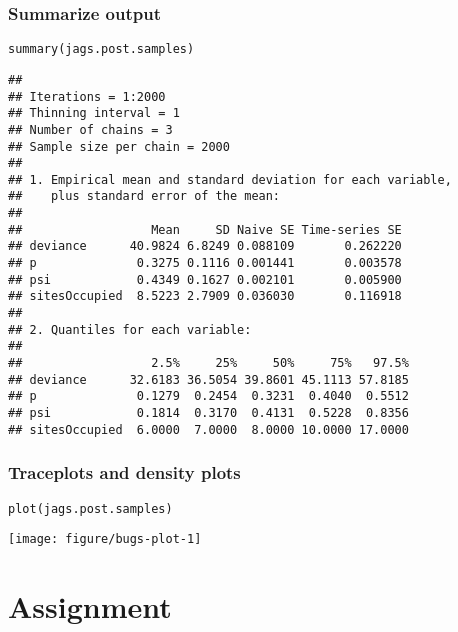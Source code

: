\documentclass[color=usenames,dvipsnames]{beamer}\usepackage[]{graphicx}\usepackage[]{color}
\makeatletter
\newcommand{\hlstd}[1]{\textcolor[rgb]{0,0,0}{#1}}%
\newcommand{\hlkwd}[1]{\textcolor[rgb]{0.004,0.004,0.506}{#1}}%
\newenvironment{kframe}{%
 \def\at@end@of@kframe{}%
 \ifinner\ifhmode%
  \def\at@end@of@kframe{\end{minipage}}%
  \begin{minipage}{\columnwidth}%
 \fi\fi%
 \def\FrameCommand##1{\hskip\@totalleftmargin \hskip-\fboxsep
 \colorbox{shadecolor}{##1}\hskip-\fboxsep
     \hskip-\linewidth \hskip-\@totalleftmargin \hskip\columnwidth}%
 \MakeFramed {\advance\hsize-\width
   \@totalleftmargin\z@ \linewidth\hsize
   \@setminipage}}%
 {\par\unskip\endMakeFramed%
 \at@end@of@kframe}
\newenvironment{knitrout}{}{} %
\makeatother
\begin{document}
\begin{frame}[fragile]
  \frametitle{Summarize output}
\begin{knitrout}\scriptsize
{}\color{fgcolor}\begin{kframe}
\begin{alltt}
\hlkwd{summary}\hlstd{(jags.post.samples)}
\end{alltt}
\begin{verbatim}
## 
## Iterations = 1:2000
## Thinning interval = 1 
## Number of chains = 3 
## Sample size per chain = 2000 
## 
## 1. Empirical mean and standard deviation for each variable,
##    plus standard error of the mean:
## 
##                  Mean     SD Naive SE Time-series SE
## deviance      40.9824 6.8249 0.088109       0.262220
## p              0.3275 0.1116 0.001441       0.003578
## psi            0.4349 0.1627 0.002101       0.005900
## sitesOccupied  8.5223 2.7909 0.036030       0.116918
## 
## 2. Quantiles for each variable:
## 
##                  2.5%     25%     50%     75%   97.5%
## deviance      32.6183 36.5054 39.8601 45.1113 57.8185
## p              0.1279  0.2454  0.3231  0.4040  0.5512
## psi            0.1814  0.3170  0.4131  0.5228  0.8356
## sitesOccupied  6.0000  7.0000  8.0000 10.0000 17.0000
\end{verbatim}
\end{kframe}
\end{knitrout}
\end{frame}




\begin{frame}[fragile]
  \frametitle{Traceplots and density plots}
\begin{knitrout}\footnotesize
{}\color{fgcolor}\begin{kframe}
\begin{alltt}
\hlkwd{plot}\hlstd{(jags.post.samples)}
\end{alltt}
\end{kframe}

{\centering \texttt{[image: figure/bugs-plot-1]} 

}



\end{knitrout}
\end{frame}


\section{Assignment}
\end{document}
